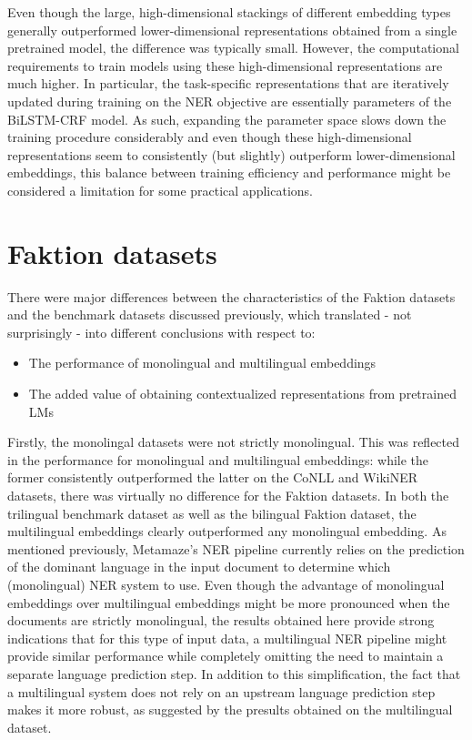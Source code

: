 \documentclass[12pt,a4paper,]{book}
\providecommand{\tightlist}{%
  \setlength{\itemsep}{0pt}\setlength{\parskip}{0pt}}
\begin{document}
Even though the large, high-dimensional stackings of different embedding types generally outperformed lower-dimensional representations obtained from a single pretrained model, the difference was typically small. However, the computational requirements to train models using these high-dimensional representations are much higher. In particular, the task-specific representations that are iteratively updated during training on the NER objective are essentially parameters of the BiLSTM-CRF model. As such, expanding the parameter space slows down the training procedure considerably and even though these high-dimensional representations seem to consistently (but slightly) outperform lower-dimensional embeddings, this balance between training efficiency and performance might be considered a limitation for some practical applications.

\hypertarget{faktion-datasets-2}{%
\section{Faktion datasets}\label{faktion-datasets-2}}

There were major differences between the characteristics of the Faktion datasets and the benchmark datasets discussed previously, which translated - not surprisingly - into different conclusions with respect to:

\begin{itemize}
\tightlist
\item
  The performance of monolingual and multilingual embeddings
\item
  The added value of obtaining contextualized representations from pretrained LMs
\end{itemize}

Firstly, the monolingal datasets were not strictly monolingual. This was reflected in the performance for monolingual and multilingual embeddings: while the former consistently outperformed the latter on the CoNLL and WikiNER datasets, there was virtually no difference for the Faktion datasets. In both the trilingual benchmark dataset as well as the bilingual Faktion dataset, the multilingual embeddings clearly outperformed any monolingual embedding. As mentioned previously, Metamaze's NER pipeline currently relies on the prediction of the dominant language in the input document to determine which (monolingual) NER system to use. Even though the advantage of monolingual embeddings over multilingual embeddings might be more pronounced when the documents are strictly monolingual, the results obtained here provide strong indications that for this type of input data, a multilingual NER pipeline might provide similar performance while completely omitting the need to maintain a separate language prediction step. In addition to this simplification, the fact that a multilingual system does not rely on an upstream language prediction step makes it more robust, as suggested by the presults obtained on the multilingual dataset.
\end{document}
